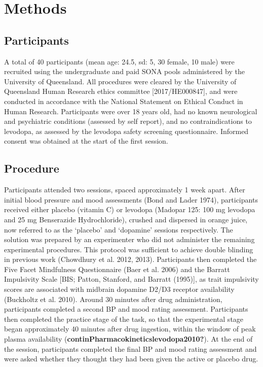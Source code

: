\documentclass{article}
\begin{document}
\hypertarget{methods}{%
\section{Methods}\label{methods}}

\label{sec:Methods}

\hypertarget{participants}{%
\subsection{Participants}\label{participants}}

A total of 40 participants (mean age: 24.5, sd: 5, 30 female, 10 male)
were recruited using the undergraduate and paid SONA pools administered
by the University of Queensland. All procedures were cleared by the
University of Queensland Human Research ethics committee
{[}2017/HE000847{]}, and were conducted in accordance with the National
Statement on Ethical Conduct in Human Research. Participants were over
18 years old, had no known neurological and psychiatric conditions
(assessed by self report), and no contraindications to levodopa, as
assessed by the levodopa safety screening questionnaire. Informed
consent was obtained at the start of the first session.

\hypertarget{procedure}{%
\subsection{Procedure}\label{procedure}}

Participants attended two sessions, spaced approximately 1 week apart.
After initial blood pressure and mood assessments (Bond and Lader 1974),
participants received either placebo (vitamin C) or levodopa (Madopar
125: 100 mg levodopa and 25 mg Benserazide Hydrochloride), crushed and
dispersed in orange juice, now referred to as the `placebo' and
`dopamine' sessions respectively. The solution was prepared by an
experimenter who did not administer the remaining experimental
procedures. This protocol was sufficient to achieve double blinding in
previous work (Chowdhury et al. 2012, 2013). Participants then completed
the Five Facet Mindfulness Questionnaire (Baer et al. 2006) and the
Barratt Impulsivity Scale {[}BIS; Patton, Stanford, and Barratt
(1995){]}, as trait impulsivity scores are associated with midbrain
dopamine D2/D3 receptor availability (Buckholtz et al. 2010). Around 30
minutes after drug administration, participants completed a second BP
and mood rating assessment. Participants then completed the practice
stage of the task, so that the experimental stage began approximately 40
minutes after drug ingestion, within the window of peak plasma
availability (\textbf{continPharmacokineticslevodopa2010?}). At the end
of the session, participants completed the final BP and mood rating
assessment and were asked whether they thought they had been given the
active or placebo drug.
\end{document}

